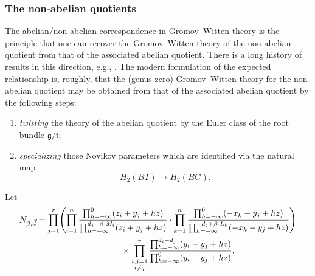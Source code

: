 \documentclass[pdftex]{sigma}
\numberwithin{equation}{section}
\newcommand{\MB}{M}
\newcommand{\LB}{L}
\newcommand{\z}{z}
\newcommand{\x}{x}
\newcommand{\y}{y}
\begin{document}
\subsubsection{The non-abelian quotients}
The abelian/non-abelian correspondence in Gromov--Witten theory is the principle that one can recover the Gromov--Witten theory of the non-abelian quotient from that of the associated abelian quotient. There is a long history of results in this direction, e.g., \cite{BCK, BCK2, CKS, CLS, Web, Web2}. The modern formulation of the expected relationship is, roughly, that the (genus zero) Gromov--Witten theory for the non-abelian quotient may be obtained from that of the associated abelian quotient by the following steps:
\begin{enumerate}\itemsep=0pt
\item[1)] \emph{twisting} the theory of the abelian quotient by the Euler class of the root bundle $\mathfrak g/\mathfrak t$;
\item[2)] \emph{specializing} those Novikov parameters which are identified via the natural map
\[
H_2(BT) \to H_2(BG).
\]
\end{enumerate}
Let
\begin{gather}%
 N_{\beta,\vec{d}}=
	 \prod_{j=1}^r\Biggl(\prod_{i=1}^n \frac{\prod_{h=-\infty}^0 (\z_i+\y_j+hz)}{\prod_{h=-\infty}^{d_j-\beta\cdot \MB_i} (\z_i+\y_j+hz)}
	\cdot \prod_{k=1}^{n}\frac{\prod_{h=-\infty}^{0}(-\x_k -\y_j+hz)}{\prod_{h=-\infty}^{-d_j+\beta\cdot \LB_k}(-\x_k -\y_j+hz)}\Biggr) \nonumber \\
	\hphantom{ N_{\beta,\vec{d}}=\prod_{j=1}^r}{}
 \times \prod_{\substack{i,j=1\\ i\neq j}}^r
	\frac{\prod_{h=-\infty}^{d_i-d_j}(\y_i-\y_j+hz)}{\prod_{h=-\infty}^{0}(\y_i-\y_j+hz)} .\label{Nbeta}
	\end{gather}
\end{document}
